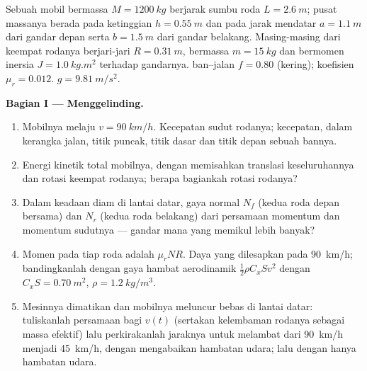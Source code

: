 \begin{problem}
\label{pb:b2:rigid-body-mechanics:1}

Sebuah mobil bermassa $M = \qty{1200}{kg}$ berjarak sumbu roda
$L = \qty{2.6}{m}$; pusat massanya berada pada ketinggian
$h = \qty{0.55}{m}$ dan pada jarak mendatar $a = \qty{1.1}{m}$ dari
gandar depan serta $b = \qty{1.5}{m}$ dari gandar belakang.
Masing-masing dari keempat rodanya berjari-jari $R = \qty{0.31}{m}$,
bermassa $m =
\qty{15}{kg}$ dan bermomen inersia $J = \qty{1.0}{kg.m^2}$ terhadap
gandarnya.  ban--jalan $f = 0.80$ (kering); koefisien
 $\mu_r = 0.012$. $g = \qty{9.81}{m/s^2}$.

\medskip
\noindent\textbf{Bagian I --- Menggelinding.}
\begin{enumerate}
  \item Mobilnya melaju $v = \qty{90}{km/h}$. Kecepatan sudut rodanya;
        kecepatan, dalam kerangka jalan, titik puncak, titik dasar dan
        titik depan sebuah bannya.
  \item Energi kinetik total mobilnya, dengan memisahkan translasi
        keseluruhannya dan rotasi keempat rodanya; berapa bagiankah
        rotasi rodanya?
  \item Dalam keadaan diam di lantai datar, gaya normal $N_f$ (kedua
        roda depan bersama) dan $N_r$ (kedua roda belakang) dari
        persamaan momentum dan momentum sudutnya --- gandar mana yang
        memikul lebih banyak?
  \item Momen  pada tiap roda adalah $\mu_rNR$. Daya
        yang dilesapkan  pada \qty{90}{km/h};
        bandingkanlah dengan gaya hambat aerodinamik
        $\tfrac12\rho C_xSv^2$ dengan $C_xS =
        \qty{0.70}{m^2}$, $\rho = \qty{1.2}{kg/m^3}$.
  \item Mesinnya dimatikan dan mobilnya meluncur bebas di lantai datar:
        tuliskanlah persamaan bagi $v(t)$ (sertakan kelembaman rodanya
        sebagai massa efektif) lalu perkirakanlah jaraknya untuk
        melambat dari \qty{90}{km/h} menjadi \qty{45}{km/h}, dengan
        mengabaikan hambatan udara; lalu dengan hanya hambatan udara.
\end{enumerate}


\end{problem}
